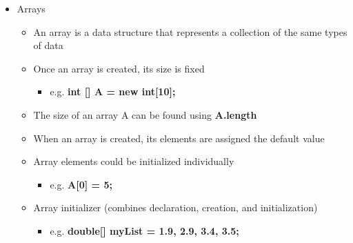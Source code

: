 \begin{itemize}
	\item Arrays
	\begin{itemize}
		\item An array is a data structure that represents a collection of the same types of data
		\item Once an array is created, its size is fixed
		\begin{itemize}
			\item e.g. \textbf{int [] A = new int[10];}
		\end{itemize}
		\item The size of an array A can be found using \textbf{A.length}
		\item When an array is created, its elements are assigned the default value
		\item Array elements could be initialized individually
		\begin{itemize}
			\item e.g. \textbf{A[0] = 5;}
		\end{itemize}
		\item Array initializer (combines declaration, creation, and initialization)
		\begin{itemize}
			\item e.g. \textbf{double[] myList = {1.9, 2.9, 3.4, 3.5};}
		\end{itemize}
	\end{itemize}


\end{itemize}
